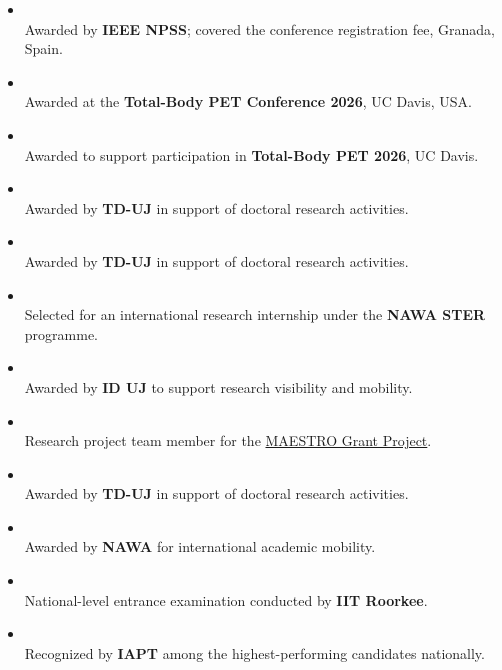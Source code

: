 \noindent {}
\begin{itemize}
    \item {} \\
    Awarded by \textbf{IEEE NPSS}; covered the conference registration fee, Granada, Spain.

    \item {} \\
    Awarded at the \textbf{Total-Body PET Conference 2026}, UC Davis, USA.

    \item {} \\
    Awarded to support participation in \textbf{Total-Body PET 2026}, UC Davis.

    \item {} \\
    Awarded by \textbf{TD-UJ} in support of doctoral research activities.

    \item {} \\
    Awarded by \textbf{TD-UJ} in support of doctoral research activities.

    \item {} \\
    Selected for an international research internship under the \textbf{NAWA STER} programme.

    \item {} \\
    Awarded by \textbf{ID UJ} to support research visibility and mobility.

    \item {} \\
    Research project team member for the \href{https://koza.if.uj.edu.pl/maestro/presentations.php}{MAESTRO Grant Project}.

    \item {} \\
    Awarded by \textbf{TD-UJ} in support of doctoral research activities.

    \item {} \\
    Awarded by \textbf{NAWA} for international academic mobility.

    \item {} \\
    National-level entrance examination conducted by \textbf{IIT Roorkee}.

    \item {} \\
    Recognized by \textbf{IAPT} among the highest-performing candidates nationally.
\end{itemize}